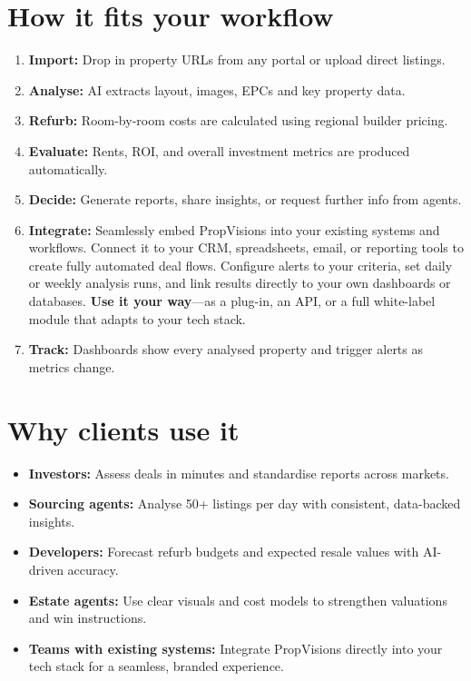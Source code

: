 \documentclass[11pt,a4paper]{article}
\newcommand{\product}{PropVisions}
\begin{document}
\section*{How it fits your workflow}
\begin{enumerate}
  \item \textbf{Import:} Drop in property URLs from any portal or upload direct listings.
  \item \textbf{Analyse:} AI extracts layout, images, EPCs and key property data.
  \item \textbf{Refurb:} Room-by-room costs are calculated using regional builder pricing.
  \item \textbf{Evaluate:} Rents, ROI, and overall investment metrics are produced automatically.
  \item \textbf{Decide:} Generate reports, share insights, or request further info from agents.
  \item \textbf{Integrate:} Seamlessly embed \product{} into your existing systems and workflows.  
        Connect it to your CRM, spreadsheets, email, or reporting tools to create fully automated deal flows.  
        Configure alerts to your criteria, set daily or weekly analysis runs, and link results directly to your own dashboards or databases.  
        \textbf{Use it your way}—as a plug-in, an API, or a full white-label module that adapts to your tech stack.
  \item \textbf{Track:} Dashboards show every analysed property and trigger alerts as metrics change.
\end{enumerate}

\section*{Why clients use it}
\begin{itemize}
  \item \textbf{Investors:} Assess deals in minutes and standardise reports across markets.
  \item \textbf{Sourcing agents:} Analyse 50+ listings per day with consistent, data-backed insights.
  \item \textbf{Developers:} Forecast refurb budgets and expected resale values with AI-driven accuracy.
  \item \textbf{Estate agents:} Use clear visuals and cost models to strengthen valuations and win instructions.
  \item \textbf{Teams with existing systems:} Integrate PropVisions directly into your tech stack for a seamless, branded experience.
\end{itemize}
\end{document}
